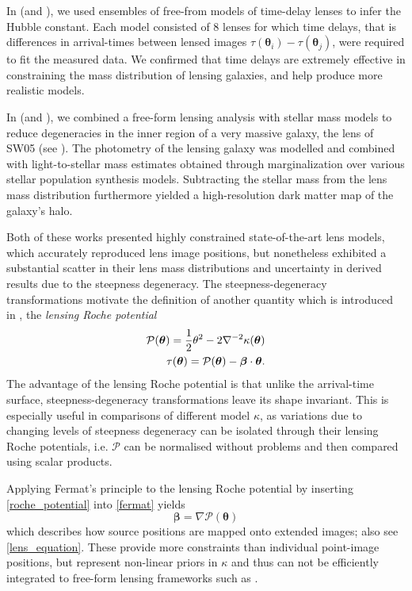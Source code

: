 In  (and ), we used ensembles of free-from models of
time-delay lenses to infer the Hubble constant.  Each model consisted of 8
lenses for which time delays, that is differences in arrival-times between
lensed images $\tau(\bm\theta_{i}) - \tau(\bm\theta_{j})$, were required to fit
the measured data.  We confirmed that time delays are extremely effective in
constraining the mass distribution of lensing galaxies, and help produce more
realistic models.

In  (and ), we combined a free-form lensing
analysis with stellar mass models to reduce degeneracies in the inner region of
a very massive galaxy, the lens of SW05 (see ).  The photometry
of the lensing galaxy was modelled and combined with light-to-stellar mass
estimates obtained through marginalization over various stellar population
synthesis models.  Subtracting the stellar mass from the lens mass distribution
furthermore yielded a high-resolution dark matter map of the galaxy's halo.

Both of these works presented highly constrained state-of-the-art lens models,
which accurately reproduced lens image positions, but nonetheless exhibited a
substantial scatter in their lens mass distributions and uncertainty in derived
results due to the steepness degeneracy.  The steepness-degeneracy
transformations motivate the definition of another quantity which is introduced
in , the \textit{lensing Roche potential}
%
\begin{equation}\eqlbl{roche_potential}%
    \begin{aligned}%
        \mathcal{P}(\bm\theta) = 
        \frac{1}{2}\theta^{2} - 2\nabla^{-2}\kappa(\bm\theta) \\
        \tau(\bm\theta) = \mathcal{P}(\bm\theta) - \bm\beta\cdot\bm\theta.
    \end{aligned}%
\end{equation}%
%
The advantage of the lensing Roche potential is that unlike the arrival-time
surface, steepness-degeneracy transformations leave its shape invariant.  This
is especially useful in comparisons of different model $\kappa$, as variations
due to changing levels of steepness degeneracy can be isolated through their
lensing Roche potentials, i.e. $\mathcal{P}$ can be normalised without problems
and then compared using scalar products.

Applying Fermat's principle to the lensing Roche potential by inserting
\eqref*{roche_potential} into \eqref{fermat} yields
%
\begin{equation}%
    \bm\beta = \nabla\mathcal{P}(\bm\theta)
\end{equation}%
%
which describes how source positions are mapped onto extended images; also see
\eqref{lens_equation}.  These provide more constraints than individual
point-image positions, but represent non-linear priors in $\kappa$ and thus can
not be efficiently integrated to free-form lensing frameworks such as
.  

